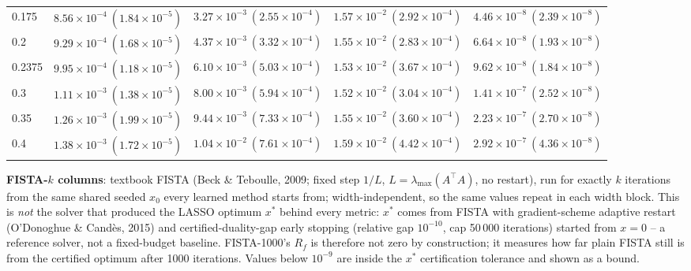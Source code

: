 \begin{table}[htbp]
\begin{tabular}{@{} l rrrr @{}}
0.175 & $8.56\!\times\!10^{-4}\ (1.84\!\times\!10^{-5})$ & $3.27\!\times\!10^{-3}\ (2.55\!\times\!10^{-4})$ & $1.57\!\times\!10^{-2}\ (2.92\!\times\!10^{-4})$ & $4.46\!\times\!10^{-8}\ (2.39\!\times\!10^{-8})$ \\
0.2 & $9.29\!\times\!10^{-4}\ (1.68\!\times\!10^{-5})$ & $4.37\!\times\!10^{-3}\ (3.32\!\times\!10^{-4})$ & $1.55\!\times\!10^{-2}\ (2.83\!\times\!10^{-4})$ & $6.64\!\times\!10^{-8}\ (1.93\!\times\!10^{-8})$ \\
0.2375 & $9.95\!\times\!10^{-4}\ (1.18\!\times\!10^{-5})$ & $6.10\!\times\!10^{-3}\ (5.03\!\times\!10^{-4})$ & $1.53\!\times\!10^{-2}\ (3.67\!\times\!10^{-4})$ & $9.62\!\times\!10^{-8}\ (1.84\!\times\!10^{-8})$ \\
0.3 & $1.11\!\times\!10^{-3}\ (1.38\!\times\!10^{-5})$ & $8.00\!\times\!10^{-3}\ (5.94\!\times\!10^{-4})$ & $1.52\!\times\!10^{-2}\ (3.04\!\times\!10^{-4})$ & $1.41\!\times\!10^{-7}\ (2.52\!\times\!10^{-8})$ \\
0.35 & $1.26\!\times\!10^{-3}\ (1.99\!\times\!10^{-5})$ & $9.44\!\times\!10^{-3}\ (7.33\!\times\!10^{-4})$ & $1.55\!\times\!10^{-2}\ (3.60\!\times\!10^{-4})$ & $2.23\!\times\!10^{-7}\ (2.70\!\times\!10^{-8})$ \\
0.4 & $1.38\!\times\!10^{-3}\ (1.72\!\times\!10^{-5})$ & $1.04\!\times\!10^{-2}\ (7.61\!\times\!10^{-4})$ & $1.59\!\times\!10^{-2}\ (4.42\!\times\!10^{-4})$ & $2.92\!\times\!10^{-7}\ (4.36\!\times\!10^{-8})$ \\
\bottomrule
\end{tabular}
\vspace{2pt}
\begin{minipage}{\linewidth}\footnotesize
\textbf{FISTA-$k$ columns}: textbook FISTA (Beck \& Teboulle, 2009; fixed step $1/L$, $L = \lambda_{\max}(A^\top A)$, no restart), run for exactly $k$ iterations from the same shared seeded $x_0$ every learned method starts from; width-independent, so the same values repeat in each width block. This is \emph{not} the solver that produced the LASSO optimum $x^*$ behind every metric: $x^*$ comes from FISTA with gradient-scheme adaptive restart (O'Donoghue \& Cand\`es, 2015) and certified-duality-gap early stopping (relative gap $10^{-10}$, cap 50\,000 iterations) started from $x = 0$ -- a reference solver, not a fixed-budget baseline. FISTA-1000's $R_f$ is therefore not zero by construction; it measures how far plain FISTA still is from the certified optimum after 1000 iterations. Values below $10^{-9}$ are inside the $x^*$ certification tolerance and shown as a bound.
\end{minipage}
\end{table}

